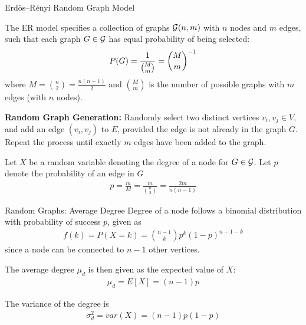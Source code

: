 \begin{frame}{Erd\"{o}s--R\'{e}nyi Random Graph Model}

The ER model specif\/{i}es a collection of graphs ${\mathcal G}(n,m)$ with $n$
nodes and $m$ edges, such
that each graph $G \in {\mathcal G}$ has equal probability of being
selected:
$$P(G) = {1 \over {M \choose m}} = {M \choose m}^{-1}$$
where $M = {n \choose 2} = \frac{n(n-1)}{2}$ and
 ${M \choose m}$ is the number of
possible graphs with $m$ edges (with $n$ nodes).

\medskip
{\bf Random Graph Generation:}
Randomly
select two distinct vertices $v_i, v_{j} \in V$, and add an
edge $(v_i, v_{j})$ to $E$, provided the edge is not already in the
graph $G$. Repeat the process until exactly $m$ edges have
been added to the graph.

\medskip
Let $X$ be a random variable denoting the degree of a node for $G
\in {\mathcal G}$.
Let $p$ denote the probability of an edge in $G$
\begin{align*}
    p = \frac{m}{M} = \frac{m}{ {n \choose 2}} = \frac{2m}{n(n-1)}
\end{align*}
\end{frame}


\begin{frame}{Random Graphs: Average Degree}
Degree of a node follows a binomial distribution with probability of
success $p$, given as
\begin{align*}
f(k) = P(X=k) = {n-1 \choose k} p^k (1-p)^{n-1-k}
\end{align*}
since a node can be connected to $n-1$ other vertices.


\medskip
The average degree $\mu_d$ is then given as the expected value of
$X$:
\begin{align*}
    \mu_d = E[X] = (n-1)p
\end{align*}

\medskip
The variance of the degree is
\begin{align*}
    \sigma^2_d = var(X) = (n-1)p(1-p)
\end{align*}
\end{frame}


